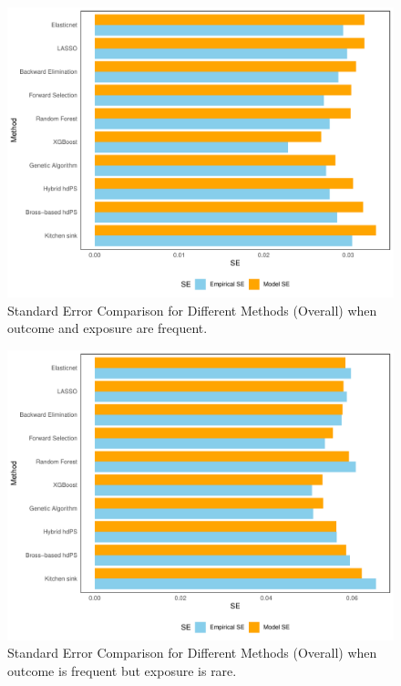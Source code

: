 \documentclass[
  10pt,
]{article}
\begin{document}
\begin{figure}

{\centering \includegraphics[width=1\linewidth]{se_comparison_plot} 

}

\caption{Standard Error Comparison for Different Methods (Overall) when outcome and exposure are frequent.}\label{fig:unnamed-chunk-1}
\end{figure}

\begin{figure}

{\centering \includegraphics[width=1\linewidth]{se_comparison_plotER} 

}

\caption{Standard Error Comparison for Different Methods (Overall) when outcome is frequent but exposure is rare.}\label{fig:unnamed-chunk-2}
\end{figure}
\end{document}
